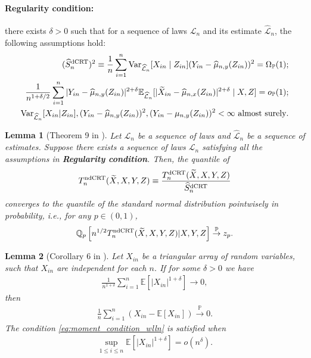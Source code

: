 \documentclass[12pt]{article}
\newtheorem{lemma}{Lemma}
\theoremstyle{definition}
\def\P{\mathbb{P}}
\def\P{\mathbb{P}}
\newcommand{\E}{\mathbb E}								%
\newcommand{\V}{\mathrm{Var}}							%
\renewcommand{\P}{\mathbb{P}}							%
\newcommand{\Q}{\mathbb{Q}}								%
\newcommand{\convp}{\overset{\mathbb{P}}{\rightarrow}}             %
\newcommand{\srx}{X}									%
\newcommand{\srz}{Z}									%
\newcommand{\srxk}{\widetilde X}						%
\newcommand{\sry}{Y}									%
\newcommand{\law}{\mathcal L}							%
\newcommand{\lawhat}{\widehat{\mathcal L}}				%
\newcommand{\dCRT}{\textnormal{dCRT}} 					%
\newcommand{\ndCRThat}{\textnormal{ndCRT}}	%
\begin{document}
\paragraph{\textbf{Regularity condition:}}
there exists $\delta>0$ such that for a sequence of laws $\law_n$ and its estimate $\lawhat_n$, the following assumptions hold:
\begin{align}
    (\widehat{S}_n^{\dCRT})^2\equiv\frac{1}{n}\sum_{i=1}^n\V_{\lawhat_n}[\srx_{in}\mid \srz_{in}](\sry_{in}-\widehat{\mu}_{n,y}(\srz_{in}))^2=\Omega_\P(1) \label{eq:variance_lower_bound};\\
    \frac{1}{n^{1+\delta/2}} \sum_{i=1}^n |\sry_{in}-\widehat \mu_{n,y}(\srz_{in})|^{2+\delta}\E_{\lawhat_n}[|\srxk_{in}-\widehat\mu_{n,x}(\srz_{in})|^{2+\delta}\mid \srx,\srz] =o_\P(1)\label{eq:Lyapunov_condition_2};\\
    \V_{\lawhat_n}[\srx_{in}|\srz_{in}],(\sry_{in}-\widehat{\mu}_{n,y}(\srz_{in}))^2,(\sry_{in}-\mu_{n,y}(\srz_{in}))^2<\infty\ \text{almost surely}\label{eq:non_degeneracy}.
\end{align}

\begin{lemma}[Theorem 9 in \cite{Niu2022a}]\label{lem:quantile_convergence_ptwise}
	Let $\law_n$ be a sequence of laws and $\lawhat_n$ be a sequence of estimates. Suppose  there exists a sequence of laws $\law_n$ satisfying all the assumptions in \textbf{Regularity condition}. Then, the quantile of 
  \begin{align}\label{eq:normalized_dcrt_stats}
    T_n^{\ndCRThat}(\srxk,\srx,\sry,\srz)\equiv \frac{T_n^{\dCRT}(\srxk,\srx,\sry,\srz)}{\widehat S_n^{\dCRT}}
  \end{align}
  converges to the quantile of the standard normal distribution pointwisely in probability, i.e., for any $p\in(0,1)$,
	\begin{align*}
		\Q_{p}\left[n^{1/2}T_n^{\ndCRThat}(\srxk,\srx,\sry,\srz)|\srx,\sry,\srz\right]\convp z_{p}.
	\end{align*}
\end{lemma}

\begin{lemma}[Corollary 6 in \cite{Niu2022a}]\label{lem:wlln}
  Let $X_{in}$ be a triangular array of random variables, such that $X_{in}$ are independent for each $n$. If for some $\delta>0$ we have 
  \begin{align}\label{eq:moment_condition_wlln}
    \frac{1}{n^{1+\delta}}\sum_{i=1}^n \E[|X_{in}|^{1+\delta}]\rightarrow 0,
  \end{align}
  then 
  \begin{align*}
    \frac{1}{n}\sum_{i=1}^n (X_{in}-\E[X_{in}])\overset{\P}{\rightarrow}0.
  \end{align*}
  The condition \eqref{eq:moment_condition_wlln} is satisfied when 
  \begin{align*}
    \sup_{1\leq i\leq n}\E[|X_{in}|^{1+\delta}]=o(n^\delta).
  \end{align*}
\end{lemma}
\end{document}
